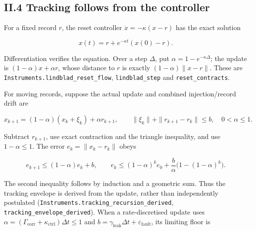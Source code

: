 \documentclass[
]{article}
\begin{document}
\subsection{II.4 Tracking follows from the
controller}\label{ii.4-tracking-follows-from-the-controller}

For a fixed record \(r\), the reset controller \(\dot x=-\kappa(x-r)\)
has the exact solution

\[
x(t)=r+e^{-\kappa t}(x(0)-r).
\]

Differentiation verifies the equation. Over a step \(\Delta\), put
\(\alpha=1-e^{-\kappa\Delta}\); the update is \((1-\alpha)x+\alpha r\),
whose distance to \(r\) is exactly \((1-\alpha)\|x-r\|\). These are
\texttt{I\allowbreak{}n\allowbreak{}s\allowbreak{}t\allowbreak{}r\allowbreak{}u\allowbreak{}m\allowbreak{}e\allowbreak{}n\allowbreak{}t\allowbreak{}s\allowbreak{}.\allowbreak{}l\allowbreak{}i\allowbreak{}n\allowbreak{}d\allowbreak{}b\allowbreak{}l\allowbreak{}a\allowbreak{}d\allowbreak{}\_\allowbreak{}r\allowbreak{}e\allowbreak{}s\allowbreak{}e\allowbreak{}t\allowbreak{}\_\allowbreak{}f\allowbreak{}l\allowbreak{}o\allowbreak{}w},
\texttt{lindblad\_step} and \texttt{reset\_contracts}.

For moving records, suppose the actual update and combined
i\allowbreak{}n\allowbreak{}j\allowbreak{}e\allowbreak{}c\allowbreak{}t\allowbreak{}i\allowbreak{}o\allowbreak{}n\allowbreak{}/\allowbreak{}r\allowbreak{}e\allowbreak{}c\allowbreak{}o\allowbreak{}r\allowbreak{}d
drift are

\[
x_{k+1}=(1-\alpha)(x_k+\xi_k)+\alpha r_{k+1},
\qquad\|\xi_k\|+\|r_{k+1}-r_k\|\le b,
\quad0<\alpha\le1.
\]

Subtract \(r_{k+1}\), use exact contraction and the triangle inequality,
and use \(1-\alpha\le1\). The error \(e_k=\|x_k-r_k\|\) obeys

\[
e_{k+1}\le(1-\alpha)e_k+b,
\qquad
e_k\le(1-\alpha)^k e_0+\frac b\alpha\bigl(1-(1-\alpha)^k\bigr).
\]

The second inequality follows by induction and a geometric sum. Thus the
tracking envelope is derived from the update, rather than independently
postulated
(\texttt{I\allowbreak{}n\allowbreak{}s\allowbreak{}t\allowbreak{}r\allowbreak{}u\allowbreak{}m\allowbreak{}e\allowbreak{}n\allowbreak{}t\allowbreak{}s\allowbreak{}.\allowbreak{}t\allowbreak{}r\allowbreak{}a\allowbreak{}c\allowbreak{}k\allowbreak{}i\allowbreak{}n\allowbreak{}g\allowbreak{}\_\allowbreak{}r\allowbreak{}e\allowbreak{}c\allowbreak{}u\allowbreak{}r\allowbreak{}s\allowbreak{}i\allowbreak{}o\allowbreak{}n\allowbreak{}\_\allowbreak{}d\allowbreak{}e\allowbreak{}r\allowbreak{}i\allowbreak{}v\allowbreak{}e\allowbreak{}d},
\texttt{t\allowbreak{}r\allowbreak{}a\allowbreak{}c\allowbreak{}k\allowbreak{}i\allowbreak{}n\allowbreak{}g\allowbreak{}\_\allowbreak{}e\allowbreak{}n\allowbreak{}v\allowbreak{}e\allowbreak{}l\allowbreak{}o\allowbreak{}p\allowbreak{}e\allowbreak{}\_\allowbreak{}d\allowbreak{}e\allowbreak{}r\allowbreak{}i\allowbreak{}v\allowbreak{}e\allowbreak{}d}).
When a rate-discretised update uses
\(\alpha=(\Gamma_{\mathrm{corr}}+\kappa_{\mathrm{ctrl}})\Delta t\le1\)
and \(b=\gamma_{\mathrm{leak}}\Delta t+\varepsilon_{\mathrm{fault}}\),
its limiting floor is
\end{document}
